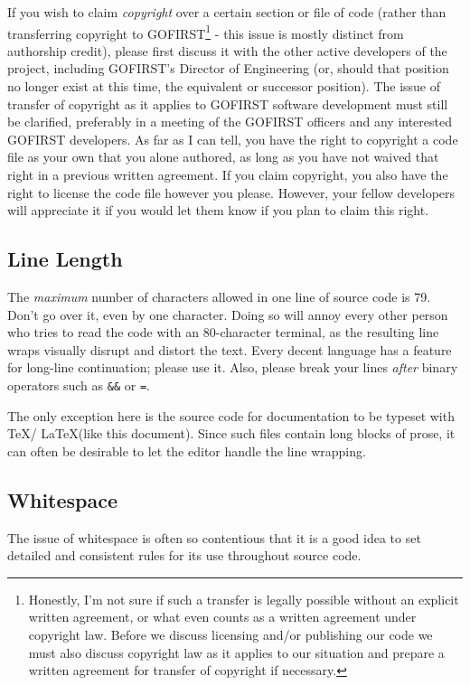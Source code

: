 \documentclass[12pt]{article}
\newcommand{\code}[1]{\texttt{#1}}
\begin{document}
If you wish to claim \emph{copyright} over a certain section or file of code (rather than transferring copyright to GOFIRST\footnote{Honestly, I'm not sure if such a transfer is legally possible without an explicit written agreement, or what even counts as a written agreement under copyright law. Before we discuss licensing and/or publishing our code we must also discuss copyright law as it applies to our situation and prepare a written agreement for transfer of copyright if necessary.}
- this issue is mostly distinct from authorship credit), please first discuss it with the other active developers of the project, including GOFIRST's Director of Engineering (or, should that position no longer exist at this time, the equivalent or successor position). The issue of transfer of copyright as it applies to GOFIRST software development must still be clarified, preferably in a meeting of the GOFIRST officers and any interested GOFIRST developers. As far as I can tell, you have the right to copyright a code file as your own that you alone authored, as long as you have not waived that right in a previous written agreement. If you claim copyright, you also have the right to license the code file however you please. However, your fellow developers will appreciate it if you would let them know if you plan to claim this right.

\subsection{Line Length} The \emph{maximum} number of characters allowed in one line of source code is 79. Don't go over it, even by one character. Doing so will annoy every other person who tries to read the code with an 80-character terminal, as the resulting line wraps visually disrupt and distort the text. Every decent language has a feature for long-line continuation; please use it. Also, please break your lines \textit{after} binary operators such as \code{\&\&} or \code{=}.

The only exception here is the source code for documentation to be typeset with \TeX / \LaTeX (like this document). Since such files contain long blocks of prose, it can often be desirable to let the editor handle the line wrapping.

\subsection{Whitespace}
\label{sec:spacing}
The issue of whitespace is often so contentious that it is a good idea to set detailed and consistent rules for its use throughout source code.
\end{document}
